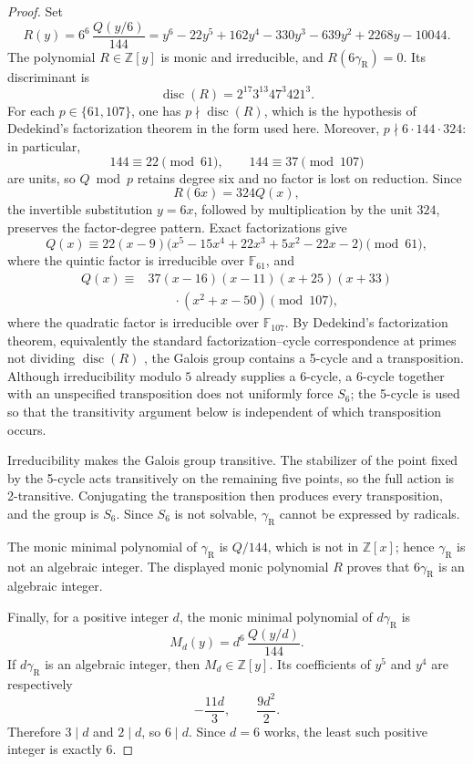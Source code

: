 \documentclass[11pt]{article}
\theoremstyle{remark}
\newcommand{\gR}{\gamma_{\mathrm R}}
\begin{document}
\begin{proof}
Set
\[
R(y)=6^6\,\frac{Q(y/6)}{144}
=y^6-22y^5+162y^4-330y^3-639y^2+2268y-10044.
\]
The polynomial \(R\in\mathbb Z[y]\) is monic and irreducible, and \(R(6\gR)=0\). Its discriminant is
\[
\operatorname{disc}(R)=2^{17}3^{13}47^3 421^3.
\]
For each \(p\in\{61,107\}\), one has \(p\nmid\operatorname{disc}(R)\), which is the hypothesis of Dedekind's factorization theorem in the form used here. Moreover, \(p\nmid6\cdot144\cdot324\): in particular,
\[
144\equiv22\pmod{61},\qquad 144\equiv37\pmod{107}
\]
are units, so \(Q\bmod p\) retains degree six and no factor is lost on reduction. Since
\[
R(6x)=324Q(x),
\]
the invertible substitution \(y=6x\), followed by multiplication by the unit \(324\), preserves the factor-degree pattern. Exact factorizations give
\[
Q(x)\equiv 22(x-9)
\bigl(x^5-15x^4+22x^3+5x^2-22x-2\bigr)\pmod {61},
\]
where the quintic factor is irreducible over \(\mathbb F_{61}\), and
\[
\begin{aligned}
Q(x)\equiv{}&37(x-16)(x-11)(x+25)(x+33)\\
&\qquad\cdot(x^2+x-50)\pmod {107},
\end{aligned}
\]
where the quadratic factor is irreducible over \(\mathbb F_{107}\). By Dedekind's factorization theorem, equivalently the standard factorization--cycle correspondence at primes not dividing \(\operatorname{disc}(R)\) \cite{Cox2012}, the Galois group contains a 5-cycle and a transposition. Although irreducibility modulo \(5\) already supplies a 6-cycle, a 6-cycle together with an unspecified transposition does not uniformly force \(S_6\); the 5-cycle is used so that the transitivity argument below is independent of which transposition occurs.

Irreducibility makes the Galois group transitive. The stabilizer of the point fixed by the 5-cycle acts transitively on the remaining five points, so the full action is 2-transitive. Conjugating the transposition then produces every transposition, and the group is \(S_6\). Since \(S_6\) is not solvable, \(\gR\) cannot be expressed by radicals.

The monic minimal polynomial of \(\gR\) is \(Q/144\), which is not in \(\mathbb Z[x]\); hence \(\gR\) is not an algebraic integer. The displayed monic polynomial \(R\) proves that \(6\gR\) is an algebraic integer.

Finally, for a positive integer \(d\), the monic minimal polynomial of \(d\gR\) is
\[
M_d(y)=d^6\,\frac{Q(y/d)}{144}.
\]
If \(d\gR\) is an algebraic integer, then \(M_d\in\mathbb Z[y]\). Its coefficients of \(y^5\) and \(y^4\) are respectively
\[
-\frac{11d}{3},\qquad \frac{9d^2}{2}.
\]
Therefore \(3\mid d\) and \(2\mid d\), so \(6\mid d\). Since \(d=6\) works, the least such positive integer is exactly \(6\).
\end{proof}
\end{document}
